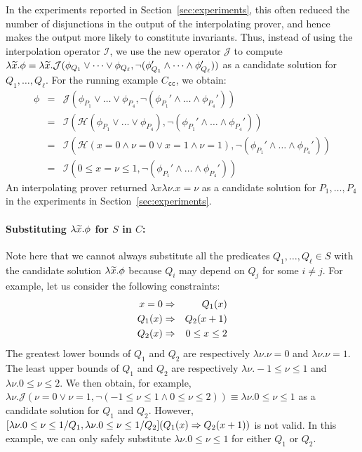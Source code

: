 In the experiments reported in Section~\ref{sec:experiments}, this often
reduced the number of disjunctions in the output of the interpolating
prover, and hence makes the output more likely to constitute invariants.
%
Thus, instead of using the interpolation operator \(\mathcal{I}\), we
use the new operator \(\mathcal{J}\) to compute \(\lambda \widetilde{x}.
\phi=\lambda\widetilde{x}.\mathcal{J}(\phi_{Q_1} \lor \dots\lor
\phi_{Q_{\ell}},\neg (\phi_{Q_1}' \land \dots \land\phi_{Q_{\ell}}'))\)
as a candidate solution for \(Q_1,\dots,Q_{\ell}\).  For the running
example \(C_{\texttt{cc}}\), we obtain:
\begin{eqnarray*}
\phi &=& \mathcal{J}(\phi_{P_1} \lor \dots \lor \phi_{P_4},\neg (\phi_{P_1}' \land \dots \land \phi_{P_4}')) \\
&=& \mathcal{I}(\mathcal{H}(\phi_{P_1} \lor \dots \lor \phi_{P_4}),\neg (\phi_{P_1}' \land \dots \land \phi_{P_4}')) \\
&=& \mathcal{I}(\mathcal{H}(x=0 \land \nu=0 \lor x=1 \land \nu=1),\neg (\phi_{P_1}' \land \dots \land \phi_{P_4}')) \\
&=& \mathcal{I}(0 \leq x=\nu \leq 1,\neg (\phi_{P_1}' \land \dots \land \phi_{P_4}'))
\end{eqnarray*}
An interpolating prover returned \(\lambda x \lambda \nu.x=\nu\) as a
candidate solution for \(P_1,\dots,P_4\) in the experiments in
Section~\ref{sec:experiments}.

\paragraph{Substituting \(\lambda \widetilde{x}.\phi\) for \(S\) in \(C\):}
Note here that we cannot always substitute all the predicates
\(Q_1,\dots,Q_{\ell} \in S\) with the candidate solution \(\lambda
\widetilde{x}.\phi\) because \(Q_i\) may depend on \(Q_j\) for some \(i \neq
j\).  For example, let us consider the following constraints:
\begin{eqnarray*}
x=0 &\Rightarrow& Q_1(x) \\
Q_1(x) &\Rightarrow& Q_2(x+1) \\
Q_2(x) &\Rightarrow& 0 \leq x \leq 2
\end{eqnarray*}
The greatest lower bounds of \(Q_1\) and \(Q_2\) are respectively
\(\lambda \nu.\nu=0\) and \(\lambda \nu.\nu=1\).  The least upper bounds
of \(Q_1\) and \(Q_2\) are respectively \(\lambda \nu.-1 \leq \nu\leq 1\)
and \(\lambda \nu.0 \leq \nu \leq 2\).  We then obtain, for example,
\(\lambda \nu.\mathcal{J}(\nu=0 \lor \nu=1,\neg (-1 \leq \nu\leq 1 \land
0 \leq \nu \leq 2)) \equiv \lambda \nu.0 \leq \nu \leq 1\) as a
candidate solution for \(Q_1\) and \(Q_2\).  However, \([\lambda\nu.0
\leq \nu \leq 1/Q_1,\lambda \nu.0 \leq \nu \leq 1/Q_2](Q_1(x) \Rightarrow
Q_2(x+1))\) is not valid.  In this example, we can only safely
substitute \(\lambda \nu.0 \leq \nu\leq 1\) for either \(Q_1\) or \(Q_2\).

